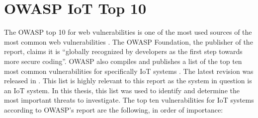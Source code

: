 \section{OWASP IoT Top 10} \label{ch:related-work:owasp}
The OWASP top 10 for web vulnerabilities is one of the most used sources of the most common web vulnerabilities \cite{owasp-www-top10}. The OWASP Foundation, the publisher of the report, claims it is \enquote{globally recognized by developers as the first step towards more secure coding}. OWASP also compiles and publishes a list of the top ten most common vulnerabilities for specifically IoT systems \cite{owasp-iot-top10}. The latest revision was released in \citeyear{owasp-iot-top10}. This list is highly relevant to this report as the system in question is an IoT system. In this thesis, this list was used to identify and determine the most important threats to investigate. The top ten vulnerabilities for IoT systems according to OWASP's report are the following, in order of importance:
